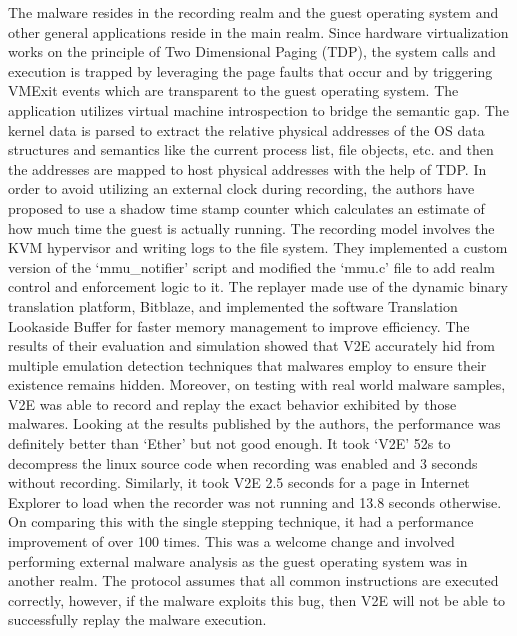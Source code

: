 \documentclass[11pt]{article}
\begin{document}
	The malware resides in the recording realm and the guest operating system and other general applications reside in the main realm. Since hardware virtualization works on the principle of Two Dimensional Paging (TDP), the system calls and execution is trapped by leveraging the page faults that occur and by triggering VMExit events which are transparent to the guest operating system. The application utilizes virtual machine introspection to bridge the semantic gap. The kernel data is parsed to extract the relative physical addresses of the OS data structures and semantics like the current process list, file objects, etc. and then the addresses are mapped to host physical addresses with the help of TDP. In order to avoid utilizing an external clock during recording, the authors have proposed to use a shadow time stamp counter which calculates an estimate of how much time the guest is actually running. The recording model involves the KVM hypervisor and writing logs to the file system. They implemented a custom version of the ‘mmu\_notifier’ script and modified the ‘mmu.c’ file to add realm control and enforcement logic to it. The replayer made use of the dynamic binary translation platform, Bitblaze, and implemented the software Translation Lookaside Buffer for faster memory management to improve efficiency. The results of their evaluation and simulation showed that V2E accurately hid from multiple emulation detection techniques that malwares employ to ensure their existence remains hidden. Moreover, on testing with real world malware samples, V2E was able to record and replay the exact behavior exhibited by those malwares. 
	Looking at the results published by the authors, the performance was definitely better than ‘Ether’ but not good enough. It took ‘V2E’ 52s to decompress the linux source code when recording was enabled and 3 seconds without recording. Similarly, it took V2E 2.5 seconds for a page in Internet Explorer to load when the recorder was not running and 13.8 seconds otherwise. On comparing this with the single stepping technique, it had a performance improvement of over 100 times. This was a welcome change and involved performing external malware analysis as the guest operating system was in another realm. The protocol assumes that all common instructions are executed correctly, however, if the malware exploits this bug, then V2E will not be able to successfully replay the malware execution.
	
	
\end{document}
